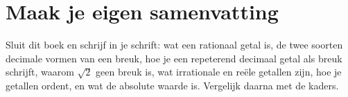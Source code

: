 \begin{oefeningen}






\end{oefeningen}


\ifzelfstudie
\section*{Maak je eigen samenvatting}
Sluit dit boek en schrijf in je schrift: wat een rationaal getal is, de twee soorten decimale vormen van een breuk, hoe je een repeterend decimaal getal als breuk schrijft, waarom $\sqrt2$ geen breuk is, wat irrationale en reële getallen zijn, hoe je getallen ordent, en wat de absolute waarde is. Vergelijk daarna met de kaders.
\fi
